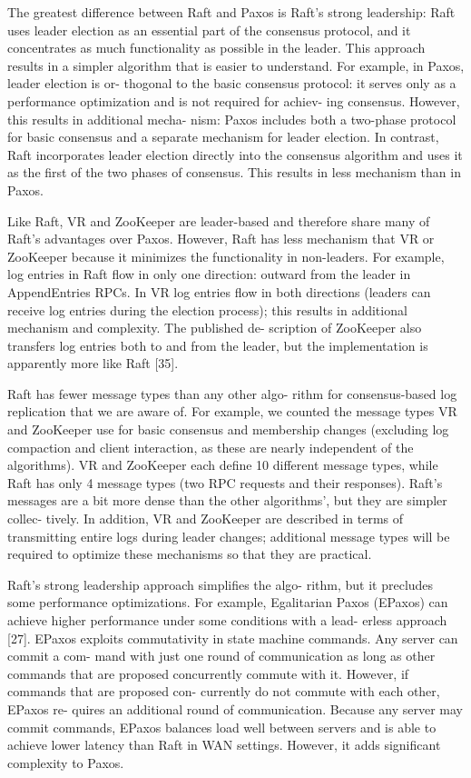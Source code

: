 \documentclass[journal]{IEEEtran}
\begin{document}
The greatest difference between Raft and Paxos is Raft’s strong leadership: Raft uses leader election as an essential part of the consensus protocol, and it concentrates as much functionality as possible in the leader. This approach results in a simpler algorithm that is easier to understand. For example, in Paxos, leader election is or- thogonal to the basic consensus protocol: it serves only as a performance optimization and is not required for achiev- ing consensus. However, this results in additional mecha- nism: Paxos includes both a two-phase protocol for basic consensus and a separate mechanism for leader election. In contrast, Raft incorporates leader election directly into the consensus algorithm and uses it as the first of the two phases of consensus. This results in less mechanism than in Paxos.


Like Raft, VR and ZooKeeper are leader-based and therefore share many of Raft’s advantages over Paxos. However, Raft has less mechanism that VR or ZooKeeper because it minimizes the functionality in non-leaders. For example, log entries in Raft flow in only one direction: outward from the leader in AppendEntries RPCs. In VR log entries flow in both directions (leaders can receive log entries during the election process); this results in additional mechanism and complexity. The published de- scription of ZooKeeper also transfers log entries both to and from the leader, but the implementation is apparently more like Raft [35].


Raft has fewer message types than any other algo- rithm for consensus-based log replication that we are aware of. For example, we counted the message types VR and ZooKeeper use for basic consensus and membership changes (excluding log compaction and client interaction, as these are nearly independent of the algorithms). VR and ZooKeeper each define 10 different message types, while Raft has only 4 message types (two RPC requests and their responses). Raft’s messages are a bit more dense than the other algorithms’, but they are simpler collec- tively. In addition, VR and ZooKeeper are described in terms of transmitting entire logs during leader changes; additional message types will be required to optimize these mechanisms so that they are practical.

Raft’s strong leadership approach simplifies the algo- rithm, but it precludes some performance optimizations. For example, Egalitarian Paxos (EPaxos) can achieve higher performance under some conditions with a lead- erless approach [27]. EPaxos exploits commutativity in state machine commands. Any server can commit a com- mand with just one round of communication as long as other commands that are proposed concurrently commute with it. However, if commands that are proposed con- currently do not commute with each other, EPaxos re- quires an additional round of communication. Because any server may commit commands, EPaxos balances load well between servers and is able to achieve lower latency than Raft in WAN settings. However, it adds significant complexity to Paxos.
\end{document}
